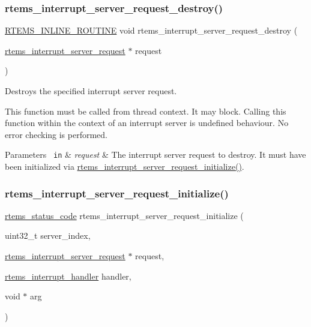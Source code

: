 \subsubsection{\texorpdfstring{rtems\_interrupt\_server\_request\_destroy()}{rtems\_interrupt\_server\_request\_destroy()}}
{\footnotesize\ttfamily \mbox{\hyperlink{group__RTEMSScoreBaseDefs_gac216239df231d5dbd15e3520b0b9313f}{R\+T\+E\+M\+S\+\_\+\+I\+N\+L\+I\+N\+E\+\_\+\+R\+O\+U\+T\+I\+NE}} void rtems\+\_\+interrupt\+\_\+server\+\_\+request\+\_\+destroy (\begin{DoxyParamCaption}\item[{\mbox{\hyperlink{structrtems__interrupt__server__request}{rtems\+\_\+interrupt\+\_\+server\+\_\+request}} $\ast$}]{request }\end{DoxyParamCaption})}



Destroys the specified interrupt server request. 

This function must be called from thread context. It may block. Calling this function within the context of an interrupt server is undefined behaviour. No error checking is performed.


\begin{DoxyParams}[1]{Parameters}
\mbox{\texttt{ in}}  & {\em request} & The interrupt server request to destroy. It must have been initialized via \mbox{\hyperlink{group__rtems__interrupt__extension_ga6cd3744454ee6cbaf6aa77ba3e6d956d}{rtems\+\_\+interrupt\+\_\+server\+\_\+request\+\_\+initialize()}}. \\
\hline
\end{DoxyParams}
\mbox{\label{group__rtems__interrupt__extension_ga6cd3744454ee6cbaf6aa77ba3e6d956d}} 
\subsubsection{\texorpdfstring{rtems\_interrupt\_server\_request\_initialize()}{rtems\_interrupt\_server\_request\_initialize()}}
{\footnotesize\ttfamily \mbox{\hyperlink{group__ClassicStatus_ga545d41846817eaba6143d52ee4d9e9fe}{rtems\+\_\+status\+\_\+code}} rtems\+\_\+interrupt\+\_\+server\+\_\+request\+\_\+initialize (\begin{DoxyParamCaption}\item[{uint32\+\_\+t}]{server\+\_\+index,  }\item[{\mbox{\hyperlink{structrtems__interrupt__server__request}{rtems\+\_\+interrupt\+\_\+server\+\_\+request}} $\ast$}]{request,  }\item[{\mbox{\hyperlink{group__rtems__interrupt__extension_gab39bd096ab2c3b41d03dace0e9777b08}{rtems\+\_\+interrupt\+\_\+handler}}}]{handler,  }\item[{void $\ast$}]{arg }\end{DoxyParamCaption})}



